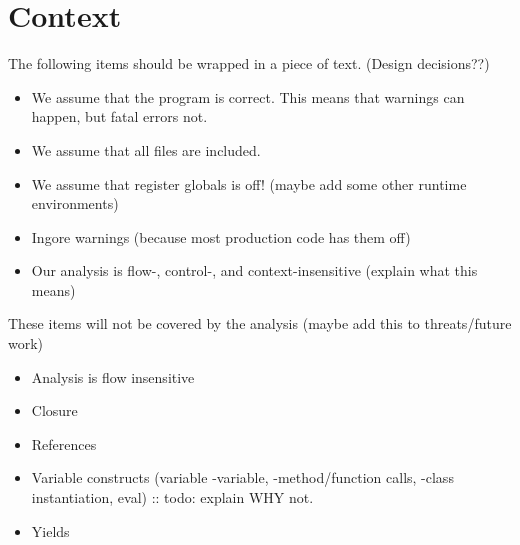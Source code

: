 \documentclass[../main.tex]{subfiles}
\begin{document}
    \section{Context}
    The following items should be wrapped in a piece of text. (Design decisions??)
    \begin{itemize}
        \item We assume that the program is correct. This means that warnings can happen, but fatal errors not.
        \item We assume that all files are included.
        \item We assume that register globals is off! (maybe add some other runtime environments)
        \item Ingore warnings (because most production code has them off)
        \item Our analysis is flow-, control-, and context-insensitive (explain what this means)
    \end{itemize}
    These items will not be covered by the analysis (maybe add this to threats/future work)
    \begin{itemize}
        \item Analysis is flow insensitive
        \item Closure
        \item References
        \item Variable constructs (variable -variable, -method/function calls, -class instantiation, eval) :: todo: explain WHY not.
        \item Yields
    \end{itemize}
\end{document}
